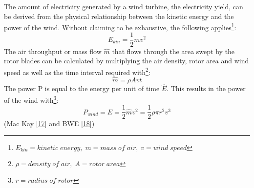 \documentclass[a4paper,11pt]{article}
\begin{document}
The amount of electricity generated by a wind turbine, the electricity yield, can be derived from the physical relationship between the kinetic energy and the power of the wind. Without claiming to be exhaustive, the following applies\footnote{\(E_{kin}= kinetic\; energy,\; m=mass\; of\; air,\; v= wind\;speed\)}:
\begin{equation}
E_{kin} = \frac{1}{2}mv^2
\end{equation}
The air throughput or mass flow \(\hat{m}\) that flows through the area swept by the rotor blades can be calculated by multiplying the air density, rotor area and wind speed as well as the time interval required with\footnote{\(\rho= density\; of\; air,\; A= rotor\; area\)}:
\begin{equation}
\hat{m}=\rho A vt
\end{equation}
The power P is equal to the energy per unit of time \(\hat{E}\). This results in the power of the wind with\footnote{\(r= radius\; of\; rotor\)}:
\begin{equation}
P_{wind}=\hat{E}=\frac{1}{2}\hat{m}v^2=\frac{1}{2} \rho \pi r^2 v^3
\end{equation}
(Mac Kay {[}\protect\hyperlink{ref-DavidJCMacKay.2009}{17}{]} and BWE {[}\protect\hyperlink{ref-BWE.2021}{18}{]})
\end{document}
